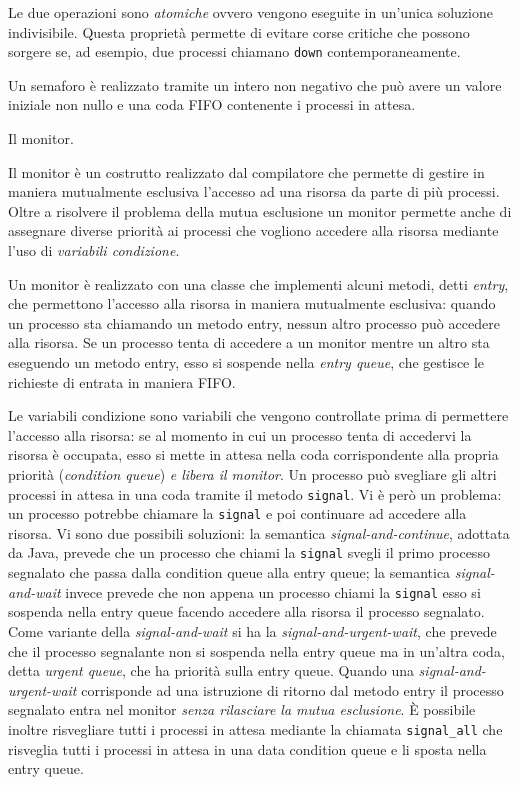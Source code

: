 \documentclass[answers,a4paper,12pt]{exam}
\begin{document}
\begin{questions}
\begin{solutionorlines}[3.8in]
Le due operazioni sono \textit{atomiche} ovvero vengono eseguite in un'unica soluzione indivisibile. Questa proprietà permette di evitare corse critiche che possono sorgere se, ad esempio, due processi chiamano \texttt{down} contemporaneamente.

Un semaforo è realizzato tramite un intero non negativo che può avere un valore iniziale non nullo e una coda FIFO contenente i processi in attesa. 
\end{solutionorlines}
\question
Il monitor.
\begin{solutionorlines}[3.8in]
	Il monitor è un costrutto realizzato dal compilatore che permette di gestire in maniera mutualmente esclusiva l'accesso ad una risorsa da parte di più processi. Oltre a risolvere il problema della mutua esclusione un monitor permette anche di assegnare diverse priorità ai processi che vogliono accedere alla risorsa mediante l'uso di \textit{variabili condizione}.
	
	Un monitor è realizzato con una classe che implementi alcuni metodi, detti \textit{entry}, che permettono l'accesso alla risorsa in maniera mutualmente esclusiva: quando un processo sta chiamando un metodo entry, nessun altro processo può accedere alla risorsa. Se un processo tenta di accedere a un monitor mentre un altro sta eseguendo un metodo entry, esso si sospende nella \textit{entry queue}, che gestisce le richieste di entrata in maniera FIFO.
	
	Le variabili condizione sono variabili che vengono controllate prima di permettere l'accesso alla risorsa: se al momento in cui un processo tenta di accedervi la risorsa è occupata, esso si mette in attesa nella coda corrispondente alla propria priorità (\textit{condition queue}) \textit{e libera il monitor}. Un processo può svegliare gli altri processi in attesa in una coda tramite il metodo \texttt{signal}. Vi è però un problema: un processo potrebbe chiamare la \texttt{signal} e poi continuare ad accedere alla risorsa. Vi sono due possibili soluzioni: la semantica \textit{signal-and-continue}, adottata da Java, prevede che un processo che chiami la \texttt{signal} svegli il primo processo segnalato che passa dalla condition queue alla entry queue; la semantica \textit{signal-and-wait} invece prevede che non appena un processo chiami la \texttt{signal} esso si sospenda nella entry queue facendo accedere alla risorsa il processo segnalato. Come variante della \textit{signal-and-wait} si ha la \textit{signal-and-urgent-wait}, che prevede che il processo segnalante non si sospenda nella entry queue ma in un'altra coda, detta \textit{urgent queue}, che ha priorità sulla entry queue. Quando una \textit{signal-and-urgent-wait} corrisponde ad una istruzione di ritorno dal metodo entry il processo segnalato entra nel monitor \textit{senza rilasciare la mutua esclusione}. È possibile inoltre risvegliare tutti i processi in attesa mediante la chiamata \texttt{signal\_all} che risveglia tutti i processi in attesa in una data condition queue e li sposta nella entry queue.
\end{solutionorlines}

\end{questions}
\end{document}
